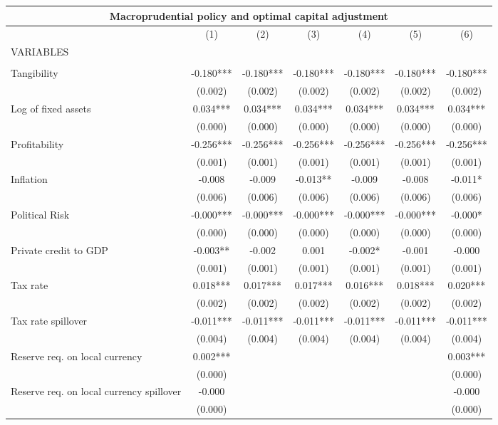\begin{tabular}{lcccccc}
\multicolumn{7}{c}{Macroprudential policy and optimal capital adjustment} \\ \hline
 & (1) & (2) & (3) & (4) & (5) & (6) \\
VARIABLES &  &  &  &  &  &  \\ \hline
 &  &  &  &  &  &  \\
Tangibility & -0.180*** & -0.180*** & -0.180*** & -0.180*** & -0.180*** & -0.180*** \\
 & (0.002) & (0.002) & (0.002) & (0.002) & (0.002) & (0.002) \\
Log of fixed assets & 0.034*** & 0.034*** & 0.034*** & 0.034*** & 0.034*** & 0.034*** \\
 & (0.000) & (0.000) & (0.000) & (0.000) & (0.000) & (0.000) \\
Profitability & -0.256*** & -0.256*** & -0.256*** & -0.256*** & -0.256*** & -0.256*** \\
 & (0.001) & (0.001) & (0.001) & (0.001) & (0.001) & (0.001) \\
Inflation & -0.008 & -0.009 & -0.013** & -0.009 & -0.008 & -0.011* \\
 & (0.006) & (0.006) & (0.006) & (0.006) & (0.006) & (0.006) \\
Political Risk & -0.000*** & -0.000*** & -0.000*** & -0.000*** & -0.000*** & -0.000* \\
 & (0.000) & (0.000) & (0.000) & (0.000) & (0.000) & (0.000) \\
Private credit to GDP & -0.003** & -0.002 & 0.001 & -0.002* & -0.001 & -0.000 \\
 & (0.001) & (0.001) & (0.001) & (0.001) & (0.001) & (0.001) \\
Tax rate & 0.018*** & 0.017*** & 0.017*** & 0.016*** & 0.018*** & 0.020*** \\
 & (0.002) & (0.002) & (0.002) & (0.002) & (0.002) & (0.002) \\
Tax rate spillover & -0.011*** & -0.011*** & -0.011*** & -0.011*** & -0.011*** & -0.011*** \\
 & (0.004) & (0.004) & (0.004) & (0.004) & (0.004) & (0.004) \\
Reserve req. on local currency & 0.002*** &  &  &  &  & 0.003*** \\
 & (0.000) &  &  &  &  & (0.000) \\
Reserve req. on local currency spillover & -0.000 &  &  &  &  & -0.000 \\
 & (0.000) &  &  &  &  & (0.000) \\

\end{tabular}
